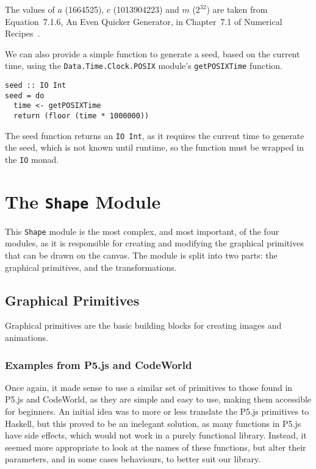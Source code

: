 \documentclass[../main.tex]{subfiles}
\begin{document}
            The values of $a$ (1664525), $c$ (1013904223) and $m$ ($2^32$) are taken from
                Equation~7.1.6, An Even Quicker Generator, in Chapter~7.1 of Numerical
                Recipes~\citep{numericalRecipes}.

            We can also provide a simple function to generate a seed, based on the current
                time, using the \texttt{Data.Time.Clock.POSIX} module's \texttt{getPOSIXTime}
                function.

            \begin{lstlisting}[label={lst:seed}, caption={The \texttt{seed} function.}]
seed :: IO Int
seed = do
  time <- getPOSIXTime
  return (floor (time * 1000000))\end{lstlisting}

            The seed function returns an \texttt{IO Int}, as it requires the current time
                to generate the seed, which is not known until runtime, so the function must be
                wrapped in the \texttt{IO} monad.

    \section{The \texttt{Shape}
        Module} This \texttt{Shape} module is the most complex, and most important, of
            the four modules, as it is responsible for creating and modifying the graphical
            primitives that can be drawn on the canvas.
        The module is split into two parts: the graphical primitives, and the
            transformations.

        \subsection{Graphical Primitives}
            Graphical primitives are the basic building blocks for creating images and
                animations.

            \subsubsection{Examples from P5.js and CodeWorld}
                Once again, it made sense to use a similar set of primitives to those found in
                    P5.js and CodeWorld, as they are simple and easy to use, making them accessible
                    for beginners.
                An initial idea was to more or less translate the P5.js primitives to Haskell,
                    but this proved to be an inelegant solution, as many functions in P5.js have
                    side effects, which would not work in a purely functional library.
                Instead, it seemed more appropriate to look at the names of these functions,
                    but alter their parameters, and in some cases behaviours, to better suit our
                    library.
\end{document}
